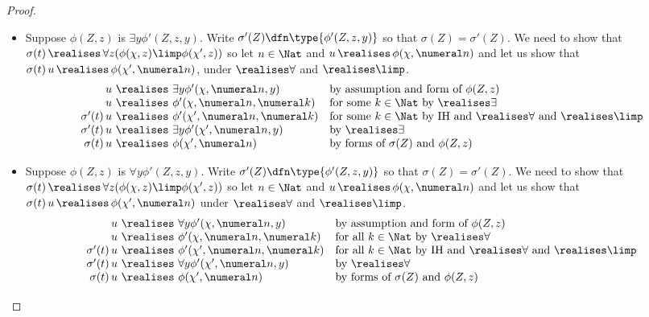 \begin{proof}
\begin{itemize}
        \item Suppose $\phi(Z,z) $ is $\exists y \phi'(Z,z,y)$. Write $\sigma'(Z)\dfn \type{\phi'(Z,z,y)}$ so that $\sigma(Z) = \sigma'(Z)$.
        We need to show that $\sigma(t) \, \realises\, \forall z (\phi(\chi,z) \limp \phi(\chi',z))$ so let $n\in \Nat$ and $u\, \realises\, \phi(\chi,\numeral n)$ and let us show that $\sigma(t)\, u\,  \realises\, \phi(\chi',\numeral n)$, under $\realises\forall$ and $\realises\limp$. 
        \[
        \begin{array}{r@{\ \realises\ }ll}
             u & \exists y \phi'(\chi,\numeral n,y) & \text{by assumption and form of $\phi(Z,z)$} \\
             u & \phi' (\chi,\numeral n, \numeral k) & \text{for some $k\in \Nat$ by $\realises\exists$} \\
             \sigma'(t)\, u & \phi'(\chi',\numeral n, \numeral k) & \text{for some $k\in \Nat$ by IH and $\realises\forall$ and $\realises\limp$} \\
             \sigma'(t)\, u & \exists y \phi'(\chi', \numeral n, y) & \text{by $\realises\exists$} \\
             \sigma(t)\, u & \phi(\chi',\numeral n) & \text{by forms of $\sigma(Z)$ and $\phi(Z,z)$}             
        \end{array}
        \]
        \item Suppose $\phi(Z,z) $ is $\forall y \phi'(Z,z,y)$. Write $\sigma'(Z) \dfn \type{\phi'(Z,z,y)}$ so that $\sigma(Z) = \sigma'(Z)$.
        We need to show that $\sigma(t)\, \realises\, \forall z (\phi(\chi,z) \limp \phi(\chi',z))$ so let $n\in \Nat $ and $u\, \realises\, \phi(\chi,\numeral n)$ and let us show that $\sigma(t)\, u\, \realises\, \phi(\chi',\numeral n)$ under $\realises\forall$ and $\realises\limp$.
        \[
        \begin{array}[b]{r@{\ \realises\ }ll}
             u & \forall y \phi'(\chi,\numeral n,y) & \text{by assumption and form of $\phi(Z,z)$} \\
             u & \phi'(\chi,\numeral n, \numeral k) & \text{for all $k\in \Nat$ by $\realises \forall$} \\
             \sigma'(t)\, u & \phi'(\chi',\numeral n, \numeral k) & \text{for all $k\in \Nat$ by IH and $\realises\forall$ and $\realises\limp$} \\
             \sigma'(t)\, u & \forall y \phi'(\chi',\numeral n, y) & \text{by $\realises\forall$} \\
             \sigma(t)\, u & \phi(\chi', \numeral n) & \text{by forms of $\sigma(Z)$ and $\phi(Z,z)$} \tag*{\qed}
        \end{array}
        \]
    \end{itemize}
    \renewcommand{\qed}{}
\end{proof}





